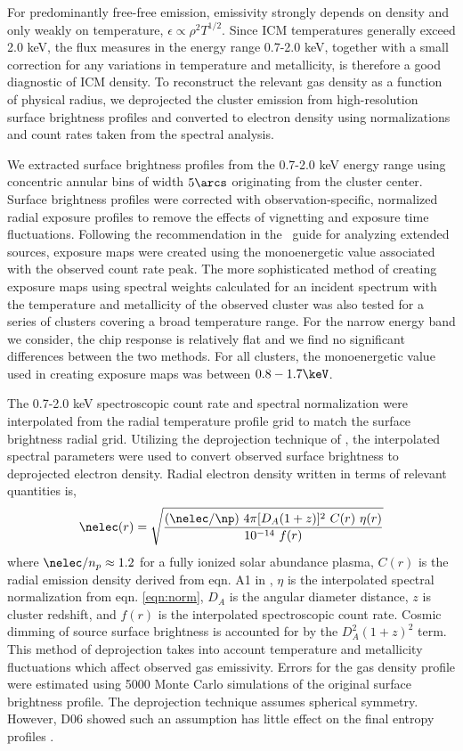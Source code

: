 \documentclass{emulateapj}
\begin{document}
For predominantly free-free emission, emissivity strongly depends on
density and only weakly on temperature, $\epsilon \propto \rho^2
T^{1/2}$. Since ICM temperatures generally exceed 2.0 keV, the flux
measures in the energy range 0.7-2.0 keV, together with a small
correction for any variations in temperature and metallicity, is
therefore a good diagnostic of ICM density. To reconstruct the
relevant gas density as a function of physical radius, we deprojected
the cluster emission from high-resolution surface brightness profiles
and converted to electron density using normalizations and count rates
taken from the spectral analysis.

We extracted surface brightness profiles from the 0.7-2.0 keV energy
range using concentric annular bins of width $5\arcs$ originating from
the cluster center. Surface brightness profiles were corrected with
observation-specific, normalized radial exposure profiles to remove
the effects of vignetting and exposure time fluctuations. Following
the recommendation in the \ciao\ guide for analyzing extended sources,
exposure maps were created using the monoenergetic value associated
with the observed count rate peak. The more sophisticated method of
creating exposure maps using spectral weights calculated for an
incident spectrum with the temperature and metallicity of the observed
cluster was also tested for a series of clusters covering a broad
temperature range. For the narrow energy band we consider, the chip
response is relatively flat and we find no significant differences
between the two methods. For all clusters, the monoenergetic value
used in creating exposure maps was between $0.8-1.7\keV$.

The 0.7-2.0 keV spectroscopic count rate and spectral normalization
were interpolated from the radial temperature profile grid to match
the surface brightness radial grid. Utilizing the deprojection
technique of \citet{kriss83}, the interpolated spectral parameters were
used to convert observed surface brightness to deprojected electron
density. Radial electron density written in terms of relevant
quantities is,
\begin{equation}
\nelec(r) = \sqrt{\frac{(\nelec/\np)~4 \pi [D_A(1+z)]^2~C(r)~\eta(r)}{10^{-14}~f(r)}}
\end{equation}
where $\nelec/n_p \approx 1.2$ for a fully ionized solar abundance
plasma, $C(r)$ is the radial emission density derived from eqn. A1 in
\citet{kriss83}, $\eta$ is the interpolated spectral normalization
from eqn. \ref{eqn:norm}, $D_A$ is the angular diameter distance, $z$
is cluster redshift, and $f(r)$ is the interpolated spectroscopic
count rate. Cosmic dimming of source surface brightness is accounted
for by the $D_A^2 (1+z)^2$ term. This method of deprojection takes
into account temperature and metallicity fluctuations which affect
observed gas emissivity. Errors for the gas density profile were
estimated using 5000 Monte Carlo simulations of the original surface
brightness profile. The \citet{kriss83} deprojection technique assumes
spherical symmetry. However, D06 showed such an assumption has little
effect on the final entropy profiles \citep[see also][for the low
impact of spherical symmetry assumptions for deriving density
profiles]{2003ApJ...598..190D, 2005MNRAS.359.1481B}.
\end{document}
